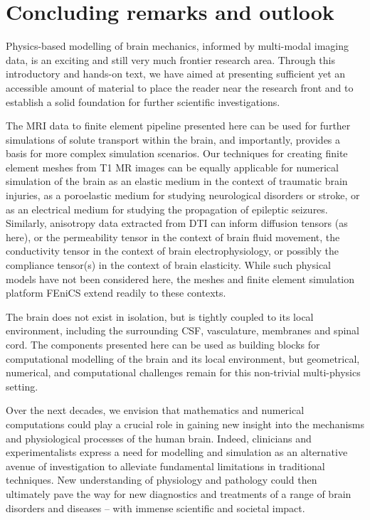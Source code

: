 \chapter{Concluding remarks and outlook}

Physics-based modelling of brain mechanics,  informed by multi-modal
imaging data, is an exciting and still very much frontier research
area. Through this introductory and hands-on text, we have aimed at
presenting sufficient yet an accessible amount of material to place
the reader near the research front and to establish a solid foundation
for further scientific investigations.

The MRI data to finite element pipeline presented here can be used for
further simulations of solute transport within the brain, and
importantly, provides a basis for more complex simulation
scenarios. Our techniques for creating finite element meshes from T1
MR images can be equally applicable for numerical simulation of the
brain as an elastic medium in the context of traumatic brain injuries,
as a poroelastic medium for studying neurological disorders or stroke,
or as an electrical medium for studying the propagation of epileptic
seizures. Similarly, anisotropy data extracted from DTI can inform
diffusion tensors (as here), or the permeability tensor in the context
of brain fluid movement, the conductivity tensor in the context of
brain electrophysiology, or possibly the compliance tensor(s) in the
context of brain elasticity. While such physical models have not been
considered here, the meshes and finite element simulation platform
FEniCS extend readily to these contexts.

The brain does not exist in isolation, but is tightly coupled to its
local environment, including the surrounding CSF, vasculature,
membranes and spinal cord. The components presented here can be used
as building blocks for computational modelling of the brain and its
local environment, but geometrical, numerical, and computational
challenges remain for this non-trivial multi-physics setting.

Over the next decades, we envision that mathematics and numerical
computations could play a crucial role in gaining new insight into the
mechanisms and physiological processes of the human brain. Indeed,
clinicians and experimentalists express a need for modelling and
simulation as an alternative avenue of investigation to alleviate
fundamental limitations in traditional techniques. New understanding
of physiology and pathology could then ultimately pave the way for new
diagnostics and treatments of a range of brain disorders and diseases
-- with immense scientific and societal impact.

